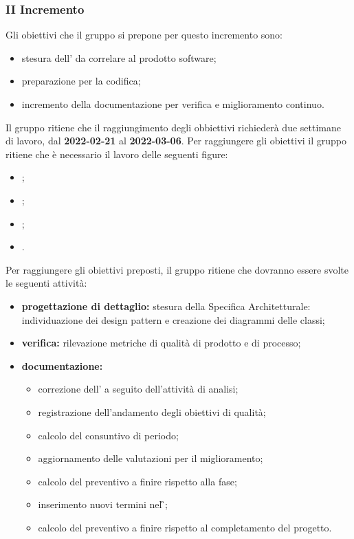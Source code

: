 \subsubsection{II Incremento}
Gli obiettivi che il gruppo si prepone per questo incremento sono:
\begin{itemize}
	\item stesura dell'\AT{} da correlare al prodotto software;
	\item preparazione per la codifica;
 \item incremento della documentazione per verifica e miglioramento continuo.
\end{itemize}
Il gruppo ritiene che il raggiungimento degli obbiettivi richiederà due settimane di lavoro, dal \textbf{2022-02-21} al \textbf{2022-03-06}.
Per raggiungere gli obiettivi il gruppo ritiene che è necessario il lavoro delle seguenti figure:
\begin{itemize}
	\item \RE{};
 	\item \AM{};
   	\item \PT{};
   	\item \VE{}.
\end{itemize}
Per raggiungere gli obiettivi preposti, il gruppo ritiene che dovranno essere svolte le seguenti attività:
\begin{itemize}
	\item \textbf{progettazione di dettaglio:} stesura della Specifica Architetturale: individuazione dei design pattern e creazione dei diagrammi delle classi;
 	\item \textbf{verifica:} rilevazione metriche di qualità di prodotto e di processo;
	\item \textbf{documentazione:} 
	 \begin{itemize}
		 \item correzione dell’\AdR{} a seguito dell’attività di analisi;
		   \item registrazione dell’andamento degli obiettivi di qualità;
		   \item calcolo del consuntivo di periodo;
		  \item aggiornamento delle valutazioni per il miglioramento; 
		  \item calcolo del preventivo a finire rispetto alla fase;
    	 \item inserimento nuovi termini nel \G{};
			\item calcolo del preventivo a finire rispetto al completamento del progetto.
	 \end{itemize}
\end{itemize}
